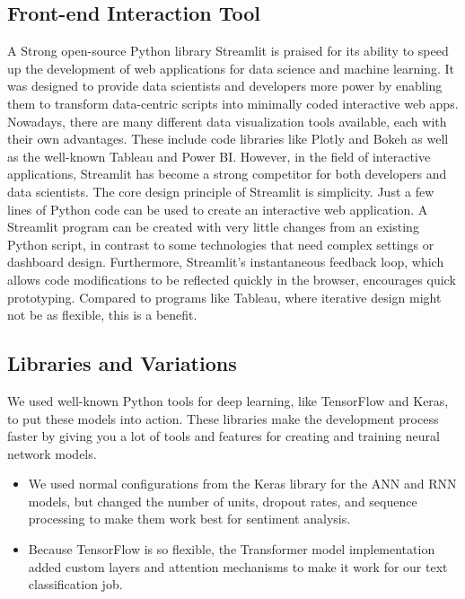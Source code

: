 \documentclass[11pt,a4paper]{article}
\begin{document}
\subsection{Front-end Interaction Tool}
A Strong open-source Python library Streamlit is praised for its ability to speed up the development of web applications for data science and machine learning. It was designed to provide data scientists and developers more power by enabling them to transform data-centric scripts into minimally coded interactive web apps. Nowadays, there are many different data visualization tools available, each with their own advantages. These include code libraries like Plotly and Bokeh as well as the well-known Tableau and Power BI. However, in the field of interactive applications, Streamlit has become a strong competitor for both developers and data scientists.
The core design principle of Streamlit is simplicity. Just a few lines of Python code can be used to create an interactive web application. A Streamlit program can be created with very little changes from an existing Python script, in contrast to some technologies that need complex settings or dashboard design. Furthermore, Streamlit's instantaneous feedback loop, which allows code modifications to be reflected quickly in the browser, encourages quick prototyping. Compared to programs like Tableau, where iterative design might not be as flexible, this is a benefit.



\subsection{Libraries and Variations}

We used well-known Python tools for deep learning, like TensorFlow and Keras, to put these models into action. These libraries make the development process faster by giving you a lot of tools and features for creating and training neural network models.

\begin{itemize}
    \item We used normal configurations from the Keras library for the ANN and RNN models, but changed the number of units, dropout rates, and sequence processing to make them work best for sentiment analysis.
    \item Because TensorFlow is so flexible, the Transformer model implementation added custom layers and attention mechanisms to make it work for our text classification job.
\end{itemize}
\end{document}
